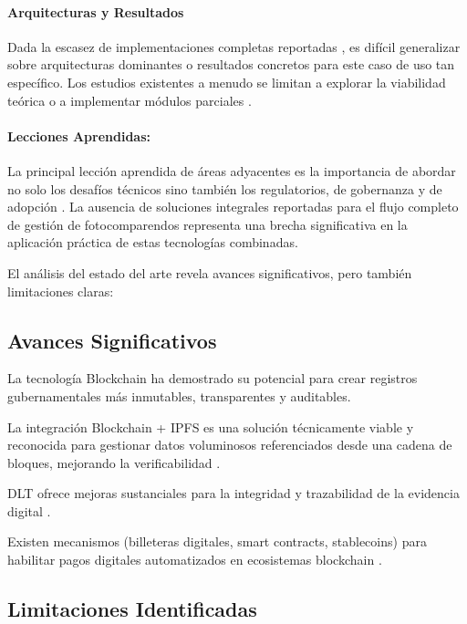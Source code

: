 \paragraph{Arquitecturas y Resultados} Dada la escasez de implementaciones completas reportadas \parencite{AnandSingh_ProjectReport_Year,juit2024traffic}, es difícil generalizar sobre arquitecturas dominantes o resultados concretos para este caso de uso tan específico. Los estudios existentes a menudo se limitan a explorar la viabilidad teórica o a implementar módulos parciales \parencite{choquevilca2024blockchain}.

\paragraph{Lecciones Aprendidas:} La principal lección aprendida de áreas adyacentes es la importancia de abordar no solo los desafíos técnicos \parencite{zheng2018blockchain} sino también los regulatorios, de gobernanza y de adopción \parencite{tan2022blockchain}. La ausencia de soluciones integrales reportadas para el flujo completo de gestión de fotocomparendos representa una brecha significativa en la aplicación práctica de estas tecnologías combinadas.

El análisis del estado del arte revela avances significativos, pero también limitaciones claras: 
  

\subsection{Avances Significativos} 

La tecnología Blockchain ha demostrado su potencial para crear registros gubernamentales más inmutables, transparentes y auditables. \parencite{balcerzak2022blockchain,meroni2023editorial} 

La integración Blockchain + IPFS es una solución técnicamente viable y reconocida para gestionar datos voluminosos referenciados desde una cadena de bloques, mejorando la verificabilidad \parencite{adel2023decentralized,mishra2024integration}. 

DLT ofrece mejoras sustanciales para la integridad y trazabilidad de la evidencia digital \parencite{thanasas2025enhancing}. 

Existen mecanismos (billeteras digitales, smart contracts, stablecoins) para habilitar pagos digitales automatizados en ecosistemas blockchain \parencite{antonopoulos2023mastering}.

\subsection{Limitaciones Identificadas} 
